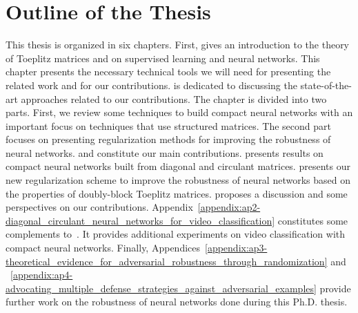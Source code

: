 \section*{Outline of the Thesis}
\label{section:ch1-outline_of_the_thesis}

This thesis is organized in six chapters.
First,  gives an introduction to the theory of Toeplitz matrices and on supervised learning and neural networks.
This chapter presents the necessary technical tools we will need for presenting the related work and for our contributions.
 is dedicated to discussing the state-of-the-art approaches related to our contributions.
The chapter is divided into two parts.
First, we review some techniques to build compact neural networks with an important focus on techniques that use structured matrices.
The second part focuses on presenting regularization methods for improving the robustness of neural networks.
 and  constitute our main contributions.
 presents results on compact neural networks built from diagonal and circulant matrices.
 presents our new regularization scheme to improve the robustness of neural networks based on the properties of doubly-block Toeplitz matrices.
 proposes a discussion and some perspectives on our contributions.
Appendix~\ref{appendix:ap2-diagonal_circulant_neural_networks_for_video_classification} constitutes some complements to~.
It provides additional experiments on video classification with compact neural networks.
Finally, Appendices~\ref{appendix:ap3-theoretical_evidence_for_adversarial_robustness_through_randomization} and ~\ref{appendix:ap4-advocating_multiple_defense_strategies_against_adversarial_examples} provide further work on the robustness of neural networks done during this Ph.D. thesis.




